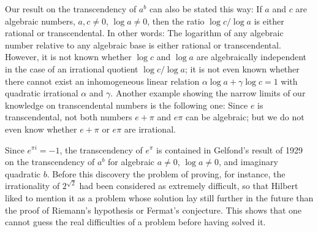 Our result on the transcendency of $a^b$ can also be stated this way: If $a$ and $c$ are algebraic numbers, $a, c \neq 0$, $\log a \neq 0$, then the ratio $\log c / \log a$ is either rational or transcendental. In other words: The logarithm of any algebraic number relative to any algebraic base is either rational or transcendental. However, it is not known whether $\log c$ and $\log a$ are algebraically independent in the case of an irrational quotient $\log c / \log a$; it is not even known whether there cannot exist an inhomogeneous linear relation $\alpha \log a + \gamma \log c = 1$ with quadratic irrational $\alpha$ and $\gamma$. Another example showing the narrow limits of our knowledge on transcendental numbers is the following one: Since $e$ is transcendental, not both numbers $e + \pi$ and $e \pi$ can be algebraic; but we do not even know whether $e + \pi$ or $e \pi$ are irrational.

Since $e^{\pi i} = -1$, the transcendency of $e^\pi$ is contained in Gelfond's result of 1929 on the transcendency of $a^b$ for algebraic $a \neq 0$, $\log a \neq 0$, and imaginary quadratic $b$. Before this discovery the problem of proving, for instance, the irrationality of $2^{\sqrt{2}}$ had been considered as extremely difficult, so that Hilbert liked to mention it as a problem whose solution lay still further in the future than the proof of Riemann's hypothesis or Fermat's conjecture. This shows that one cannot guess the real difficulties of a problem before having solved it.
